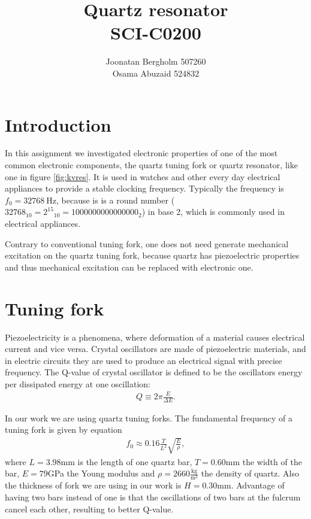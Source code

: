 \documentclass[12pt]{article}
\title{\textbf{Quartz resonator} \\ SCI-C0200}
\author{Joonatan Bergholm 507260 \\ Osama Abuzaid 524832}
\begin{document}
\maketitle
\newpage


\tableofcontents
\newpage

\section{Introduction}

In this assignment we investigated electronic properties of one of the most common electronic components, the quartz tuning fork or quartz resonator, like one in figure \ref{fig:kvres}. It is used in watches and other every day electrical appliances to provide a stable clocking frequency. Typically the frequency is $f_0 = \SI{32768}{\hertz}$, because is is a round number ($32768_{10} = {2^{15}}_{10} = 1000000000000000_2$) in base 2, which is commonly used in electrical appliances.

Contrary to conventional tuning fork, one does not need generate mechanical excitation
on the quartz tuning fork, because quartz has piezoelectric properties and thus mechanical excitation can be replaced with electronic one.

\section{Tuning fork}
Piezoelectricity is a phenomena, where deformation of a material causes electrical current and vice versa. Crystal oscillators are made of piezoelectric materials, and in electric circuits they are used to produce an electrical signal with precise frequency. The Q-value of crystal oscillator is defined to be the oscillators energy per dissipated energy at one oscillation:
\begin{align}
Q \equiv 2\pi\frac{E}{\Delta E}.
\end{align}

In our work we are using quartz tuning forks. The fundamental frequency of a tuning fork is given by equation
\begin{align}
f_0 \approx 0.16\frac{T}{L^2}\sqrt{\frac{E}{\rho}},
\end{align}
where $L = 3.98 $mm is the length of one quartz bar, $T = 0.60 $mm the width of the bar, $E = 79 $GPa the Young modulus and $\rho = 2660\frac{\mathrm{kg}}{\mathrm{m}^3}$ the density of quartz. Also the thickness of fork we are using in our work is $H = 0.30$mm. Advantage of having two bars instead of one is that the oscillations of two bars at the fulcrum cancel each other, resulting to better Q-value.
\end{document}
